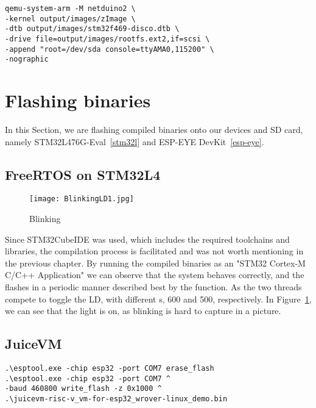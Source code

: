\begin{lstlisting}[style=SH, caption=Running Buildroot Linux with QEMU, label=runQEMUbuildroot]
qemu-system-arm -M netduino2 \
-kernel output/images/zImage \
-dtb output/images/stm32f469-disco.dtb \
-drive file=output/images/rootfs.ext2,if=scsi \
-append "root=/dev/sda console=ttyAMA0,115200" \
-nographic
\end{lstlisting}

\section{Flashing binaries} \label{flashing.ch}
In this Section, we are flashing compiled binaries onto our devices and SD card, namely STM32L476G-Eval~\ref{stm32l} and ESP-EYE DevKit~\ref{esp-eye}.

\subsection{FreeRTOS on STM32L4}

\begin{figure}[H]
\centering
\texttt{[image: BlinkingLD1.jpg]}
\caption{Blinking }
\label{fig:blinking}
\end{figure}

Since STM32CubeIDE was used, which includes the required toolchains and libraries, the compilation process is facilitated and was not worth mentioning in the previous chapter. By running the compiled binaries as an "STM32 Cortex-M C/C++ Application" we can observe that the system behaves correctly, and the \code{LD1} flashes in a periodic manner described best by the  function. As the two threads compete to toggle the LD, with different s, 600 and 500, respectively. In Figure~\ref{fig:blinking}, we can see that the light is on, as blinking is hard to capture in a picture.

\subsection{JuiceVM}

\begin{lstlisting}[style=SH, caption=Flashing JuiceVM to ESP-EYE, label=flashJuiceVM]
.\esptool.exe -chip esp32 -port COM7 erase_flash
.\esptool.exe -chip esp32 -port COM7 ^
-baud 460800 write_flash -z 0x1000 ^
.\juicevm-risc-v_vm-for-esp32_wrover-linux_demo.bin
\end{lstlisting}

